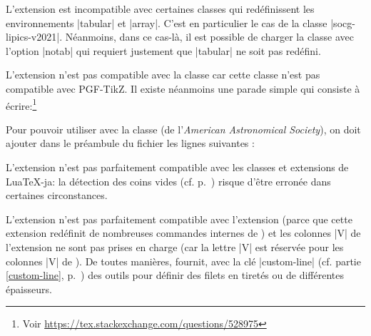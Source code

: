 \documentclass[dvipsnames]{article}%
\begin{document}
\begin{Code}
\usepackage[spanish,es-noshorthands]{babel}
\end{Code}

\medskip
L'extension  est incompatible avec certaines classes qui
redéfinissent les environnements |{tabular}| et |{array}|. C'est en particulier
le cas de la classe |socg-lipics-v2021|. Néanmoins, dans ce cas-là, il est
possible de charger la classe avec l'option |notab| qui requiert justement que
|{tabular}| ne soit pas redéfini.


\medskip
L'extension  n'est pas compatible avec la classe 
car cette classe n'est pas compatible avec PGF-TikZ. Il existe néanmoins une
parade simple qui consiste à écrire:\footnote{Voir
  \url{https://tex.stackexchange.com/questions/528975}}\par\nobreak


\medskip
Pour pouvoir utiliser  avec la classe  (de
l'\emph{American Astronomical Society}), on doit ajouter dans le préambule du
fichier les lignes suivantes :

\begin{Code}
\end{Code}

\medskip
L'extension  n'est pas parfaitement compatible avec les classes
et extensions de LuaTeX-ja: la détection des coins vides (cf.
p.~\pageref{corners}) risque d'être erronée dans certaines circonstances.

\medskip
L'extension  n'est pas parfaitement compatible avec l'extension
 (parce que cette extension redéfinit de nombreuses commandes
internes de ) et les colonnes |V| de l'extension  ne
sont pas prises en charge (car la lettre |V| est réservée pour les colonnes |V|
de ). De toutes manières,  fournit, avec la clé
|custom-line| (cf. partie \ref{custom-line}, p.~\pageref{custom-line}) des
outils pour définir des filets en tiretés ou de différentes épaisseurs.
\end{document}
